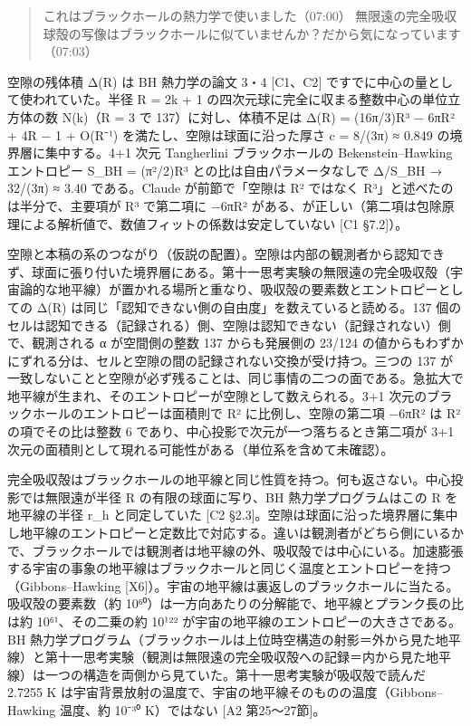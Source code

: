 \documentclass[
  a4paper,
]{ltjsarticle}
\begin{document}
\begin{quote}
これはブラックホールの熱力学で使いました（07:00）
無限遠の完全吸収球殻の写像はブラックホールに似ていませんか？だから気になっています（07:03）
\end{quote}

空隙の残体積 Δ(R) は BH 熱力学の論文 3・4 {[}C1、C2{]}
ですでに中心の量として使われていた。半径 R = 2k + 1
の四次元球に完全に収まる整数中心の単位立方体の数 N(k)（R = 3 で
137）に対し、体積不足は Δ(R) = (16π/3)R³ − 6πR² + 4R − 1 + O(R⁻¹)
を満たし、空隙は球面に沿った厚さ c = 8/(3π) ≈ 0.849
の境界層に集中する。4+1 次元 Tangherlini ブラックホールの
Bekenstein--Hawking エントロピー S\_BH = (π²/2)R³
との比は自由パラメータなしで Δ/S\_BH → 32/(3π) ≈ 3.40 である。Claude
が前節で「空隙は R² ではなく R³」と述べたのは半分で、主要項が R³
で第二項に −6πR²
がある、が正しい（第二項は包除原理による解析値で、数値フィットの係数は安定していない
{[}C1 §7.2{]}）。

空隙と本稿の系のつながり（仮説の配置）。空隙は内部の観測者から認知できず、球面に張り付いた境界層にある。第十一思考実験の無限遠の完全吸収殻（宇宙論的な地平線）が置かれる場所と重なり、吸収殻の要素数とエントロピーとしての
Δ(R) は同じ「認知できない側の自由度」を数えていると読める。137
個のセルは認知できる（記録される）側、空隙は認知できない（記録されない）側で、観測される
α が空間側の整数 137 からも発展側の 23/124
の値からもわずかにずれる分は、セルと空隙の間の記録されない交換が受け持つ。三つの
137
が一致しないことと空隙が必ず残ることは、同じ事情の二つの面である。急拡大で地平線が生まれ、そのエントロピーが空隙として数えられる。3+1
次元のブラックホールのエントロピーは面積則で R² に比例し、空隙の第二項
−6πR² は R² の項でその比は整数 6
であり、中心投影で次元が一つ落ちるとき第二項が 3+1
次元の面積則として現れる可能性がある（単位系を含めて未確認）。

完全吸収殻はブラックホールの地平線と同じ性質を持つ。何も返さない。中心投影では無限遠が半径
R の有限の球面に写り、BH 熱力学プログラムはこの R を地平線の半径 r\_h
と同定していた {[}C2
§2.3{]}。空隙は球面に沿った境界層に集中し地平線のエントロピーと定数比で対応する。違いは観測者がどちら側にいるかで、ブラックホールでは観測者は地平線の外、吸収殻では中心にいる。加速膨張する宇宙の事象の地平線はブラックホールと同じく温度とエントロピーを持つ（Gibbons--Hawking
{[}X6{]}）。宇宙の地平線は裏返しのブラックホールに当たる。吸収殻の要素数（約
10⁶⁰）は一方向あたりの分解能で、地平線とプランク長の比は約
10⁶¹、その二乗の約 10¹²² が宇宙の地平線のエントロピーの大きさである。BH
熱力学プログラム（ブラックホールは上位時空構造の射影＝外から見た地平線）と第十一思考実験（観測は無限遠の完全吸収殻への記録＝内から見た地平線）は一つの構造を両側から見ていた。第十一思考実験が吸収殻で読んだ
2.7255 K
は宇宙背景放射の温度で、宇宙の地平線そのものの温度（Gibbons--Hawking
温度、約 10⁻³⁰ K）ではない {[}A2 第25〜27節{]}。
\end{document}
